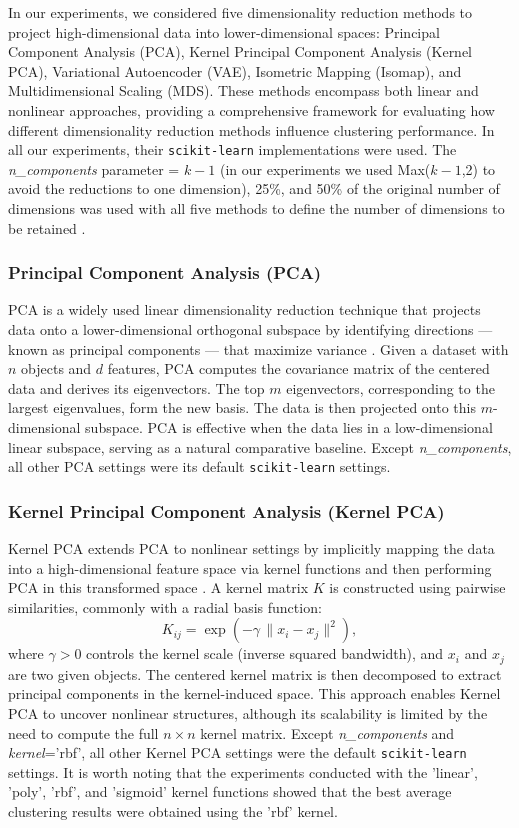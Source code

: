 \documentclass[preprint,12pt]{elsarticle}
\begin{document}
In our experiments, we considered five dimensionality reduction methods to project high-dimensional data into lower-dimensional spaces: Principal Component Analysis (PCA), Kernel Principal Component Analysis (Kernel PCA), Variational Autoencoder (VAE), Isometric Mapping (Isomap), and Multidimensional Scaling (MDS). These methods encompass both linear and nonlinear approaches, providing a comprehensive framework for evaluating how different dimensionality reduction methods influence clustering performance. In all our experiments, their \texttt{scikit-learn} implementations were used. The \textit{n\_components} parameter = {$k-1$ (in our experiments we used Max($k-1$,2) to avoid the reductions to one dimension), 25\%, and 50\%} of the original number of dimensions was used with all five methods to define the number of dimensions to be retained .

\subsubsection{Principal Component Analysis (PCA)}
PCA is a widely used linear dimensionality reduction technique that projects data onto a lower-dimensional orthogonal subspace by identifying directions — known as principal components — that maximize variance \cite{pearson1901liii}. Given a dataset with $n$ objects and \(d\) features, PCA computes the covariance matrix of the centered data and derives its eigenvectors. The top \(m\) eigenvectors, corresponding to the largest eigenvalues, form the new basis. The data is then projected onto this \(m\)-dimensional subspace. PCA is effective when the data lies in a low-dimensional linear subspace, serving as a natural comparative baseline. Except \textit{n\_components}, all other PCA settings were its default \texttt{scikit-learn} settings.

\subsubsection{Kernel Principal Component Analysis (Kernel PCA)}
Kernel PCA extends PCA to nonlinear settings by implicitly mapping the data into a high-dimensional feature space via kernel functions and then performing PCA in this transformed space \cite{scholkopf1998kpca}. A kernel matrix \(K\) is constructed using pairwise similarities, commonly with a radial basis function:
\begin{equation}
K_{ij} = \exp\left(-\gamma \, \|x_i - x_j\|^2\right),
\end{equation}
where \(\gamma > 0\) controls the kernel scale (inverse squared bandwidth), and $x_i$ and $x_j$ are two given objects. The centered kernel matrix is then decomposed to extract principal components in the kernel-induced space. This approach enables Kernel PCA to uncover nonlinear structures, although its scalability is limited by the need to compute the full \(n \times n\) kernel matrix. Except \textit{n\_components} and \textit{kernel}='rbf', all other Kernel PCA settings were the default \texttt{scikit-learn} settings. It is worth noting that the experiments conducted with the 'linear', 'poly', 'rbf', and 'sigmoid' kernel functions showed that the best average clustering results were obtained using the 'rbf' kernel. 
\end{document}
